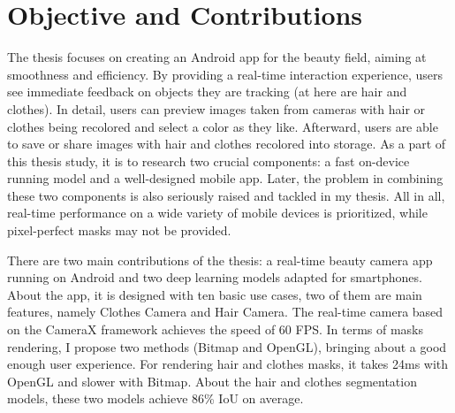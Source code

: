 \section{Objective and Contributions}

The thesis focuses on creating an Android app for the beauty field, aiming at smoothness and efficiency. By providing a real-time interaction experience, users see immediate feedback on objects they are tracking (at here are hair and clothes). In detail, users can preview images taken from cameras with hair or clothes being recolored and select a color as they like. Afterward, users are able to save or share images with hair and clothes recolored into storage. As a part of this thesis study, it is to research two crucial components: a fast on-device running model and a well-designed mobile app. Later, the problem in combining these two components is also seriously raised and tackled in my thesis. All in all, real-time performance on a wide variety of mobile devices is prioritized, while pixel-perfect masks may not be provided. \par
There are two main contributions of the thesis: a real-time beauty camera app running on Android and two deep learning models adapted for smartphones. About the app, it is designed with ten basic use cases, two of them are main features, namely Clothes Camera and Hair Camera. The real-time camera based on the CameraX framework achieves the speed of 60 FPS. In terms of masks rendering, I propose two methods (Bitmap and OpenGL), bringing about a good enough user experience. For rendering hair and clothes masks, it takes 24ms with OpenGL and slower with Bitmap. About the hair and clothes segmentation models, these two models achieve  86\% IoU on average. \par